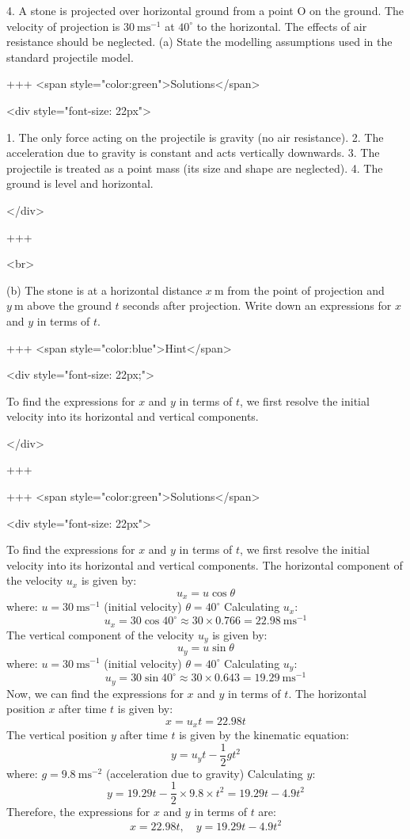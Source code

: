 4. A stone is projected over horizontal ground from a point O on the ground. The velocity of projection is $30 \mathrm{~ms}^{-1}$ at $40^{\circ}$ to the horizontal. The effects of air resistance should be neglected.
(a) State the modelling assumptions used in the standard projectile model.

+++ <span style="color:green">Solutions</span>

<div style="font-size: 22px">

1. The only force acting on the projectile is gravity (no air resistance).
2. The acceleration due to gravity is constant and acts vertically downwards.
3. The projectile is treated as a point mass (its size and shape are neglected).
4. The ground is level and horizontal.

</div>

+++

<br>


(b) The stone is at a horizontal distance $x \mathrm{~m}$ from the point of projection and $y \mathrm{~m}$ above the ground $t$ seconds after projection. Write down an expressions for $x$ and $y$ in terms of $t$.

+++ <span style="color:blue">Hint</span>

<div style="font-size: 22px;">

To find the expressions for $x$ and $y$ in terms of $t$, we first resolve the initial velocity into its horizontal and vertical components.

</div>

+++

+++ <span style="color:green">Solutions</span>

<div style="font-size: 22px">

To find the expressions for $x$ and $y$ in terms of $t$, we first resolve the initial velocity into its horizontal and vertical components.
The horizontal component of the velocity $u_x$ is given by:
$$ u_x = u \cos \theta $$
where:
$u = 30 \mathrm{~ms}^{-1}$ (initial velocity)
$\theta = 40^{\circ}$
Calculating $u_x$:
$$ u_x = 30 \cos 40^{\circ} \approx 30 \times 0.766 = 22.98 \mathrm{~ms}^{-1} $$
The vertical component of the velocity $u_y$ is given by:
$$ u_y = u \sin \theta $$
where:
$u = 30 \mathrm{~ms}^{-1}$ (initial velocity)
$\theta = 40^{\circ}$
Calculating $u_y$:
$$ u_y = 30 \sin 40^{\circ} \approx 30 \times 0.643 = 19.29 \mathrm{~ms}^{-1} $$
Now, we can find the expressions for $x$ and $y$ in terms of $t$.
The horizontal position $x$ after time $t$ is given by:
$$ x = u_x t = 22.98t $$
The vertical position $y$ after time $t$ is given by the kinematic equation:
$$ y = u_y t - \frac{1}{2} g t^2 $$
where:
$g = 9.8 \mathrm{~ms}^{-2}$ (acceleration due to gravity)
Calculating $y$:
$$ y = 19.29t - \frac{1}{2} \times 9.8 \times t^2 = 19.29t - 4.9t^2 $$
Therefore, the expressions for $x$ and $y$ in terms of $t$ are:
$$ x = 22.98t, \quad y = 19.29t - 4.9t^2 $$


